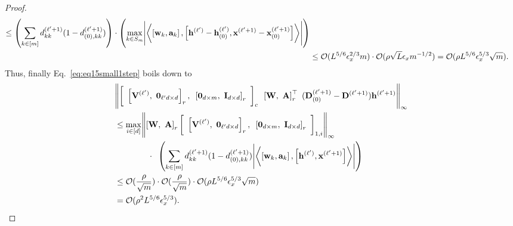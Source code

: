 \begin{proof}
\begin{align*}
		\le  \left(\sum_{k \in [m]} d^{(\ell'+1)}_{kk} (1 - d^{(\ell'+1)}_{(0), kk}) \right) \cdot  \left(\max_{k \in S_m}  \abs{\left\langle \left[\mathbf{w}_k, \mathbf{a}_k\right],  \left[ \mathbf{h}^{(\ell')} - \mathbf{h}_{(0)}^{(\ell')}, \mathbf{x}^{(\ell'+1)} - \mathbf{x}^{(\ell'+1)}_{(0)}\right] \right\rangle}  \right) \\&
		\le \mathcal{O}(L^{5/6} \epsilon_x^{2/3} m) \cdot \mathcal{O}(\rho \sqrt{L} \epsilon_x m^{-1/2}) = \mathcal{O}(\rho L^{5/6} \epsilon_x^{5/3} \sqrt{m}).
	\end{align*}
	Thus, finally Eq.~\ref{eq:eq15small1step} boils down to
	\begingroup \allowdisplaybreaks
	\begin{align*}
		&\norm{\left[\text{ }\left[\mathbf{V}^{(\ell')}, \text{ } \mathbf{0}_{\ell'd \times d}\right]_r,\text{ } \left[\mathbf{0}_{d \times m},\text{ } \mathbf{I}_{d \times d}\right]_r\text{ }\right]_c  \text{ } \left[\mathbf{W}, \text{ } \mathbf{A}\right]_r^{\top} \text{ }  (\mathbf{D}^{(\ell'+1)}_{(0)} - \mathbf{D}^{(\ell'+1)}) \mathbf{h}^{(\ell' + 1)}}_\infty 
		\\ & \le \max_{i \in [d]} \norm{\left[\mathbf{W}, \text{ } \mathbf{A}\right]_r \left[\text{ }\left[\mathbf{V}^{(\ell')}, \text{ } \mathbf{0}_{\ell'd \times d}\right]_r,\text{ } \left[\mathbf{0}_{d \times m},\text{ } \mathbf{I}_{d \times d}\right]_r\text{ }\right]_{1, i}}_{\infty} \\& \quad\quad\quad\quad \cdot \text{ }  \left( \sum_{k \in [m]} d^{(\ell'+1)}_{kk} (1 - d^{(\ell'+1)}_{(0), kk}) \abs{\left\langle \left[\mathbf{w}_k, \mathbf{a}_k\right],  \left[\mathbf{h}^{(\ell')}, \mathbf{x}^{(\ell'+1)}\right] \right\rangle} \right) \\&
		\le \mathcal{O}(\frac{\rho}{\sqrt{m}}) \cdot \mathcal{O}(\frac{\rho}{\sqrt{m}}) \cdot \mathcal{O}(\rho L^{5/6} \epsilon_x^{5/3} \sqrt{m}) \\& = \mathcal{O}(\rho^2 L^{5/6} \epsilon_x^{5/3}).
	\end{align*}
	\endgroup
	

\end{proof}
